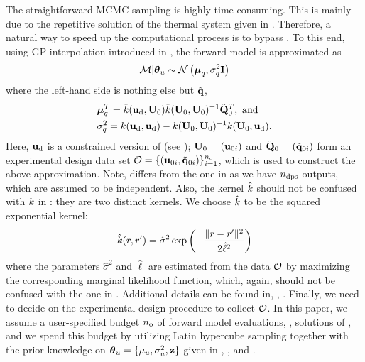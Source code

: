 The straightforward MCMC sampling is highly time-consuming. This is mainly due to the repetitive solution of the thermal system given in . Therefore, a natural way to speed up the computational process is to bypass . To this end, using GP interpolation introduced in , the forward model is approximated as
\begin{equation} \elabel{gp-approximation}
  \model | \vparam_\u \sim \gaussian{\vmean_\T}{\sigma^2_\T \mI}
\end{equation}
where the left-hand side is nothing else but $\tilde{\mathbf{q}}$,
\begin{align}
  & \vmean_\T^T = \hat{\fCov}(\vu_\data, \mU_0) \hat{\fCov}(\mU_0, \mU_0)^{-1} \mmT_0^T, \text{ and} \elabel{gp-mean} \\
  & \sigma^2_\T = \fCov{\vu_\data, \vu_\data} - \fCov{\mU_0, \mU_0}^{-1} \fCov{\mU_0, \vu_\data}. \elabel{gp-variance}
\end{align}
Here, $\mathbf{u}_{\text{d}}$ is a constrained version of  (see ); $\mathbf{U}_0 = (\mathbf{u}_{0i})$ and $\tilde{\mathbf{Q}}_0 = (\tilde{\mathbf{q}}_{0i})$ form an experimental design data set $\mathcal{O} = \{ (\mathbf{u}_{0i}, \tilde{\mathbf{q}}_{0i}) \}_{i = 1}^{n_\text{o}}$, which is used to construct the above approximation. Note,  differs from the one in  as we have ${n_\text{dps}}$ outputs, which are assumed to be independent. Also, the kernel $\hat{\fCov}$ should not be confused with $\fCov$ in : they are two distinct kernels. We choose $\hat{\fCov}$ to be the squared exponential kernel:
\[
  \hat{\fCov}(\r, \r') = \hat{\sigma}^2 \exp\left(-\frac{\norm{\r - \r'}^2}{2 \hat{\ell}^2}\right)
\]
where the parameters $\hat{\sigma}^2$ and $\hat{\ell}$ are estimated from the data $\mathcal{O}$ by maximizing the corresponding marginal likelihood function, which, again, should not be confused with the one in . Additional details can be found in, \eg, \cite{mackay2003, rasmussen2006}. Finally, we need to decide on the experimental design procedure to collect $\mathcal{O}$. In this paper, we assume a user-specified budget ${n_\text{o}}$ of forward model evaluations, \ie, solutions of , and we spend this budget by utilizing Latin hypercube sampling together with the prior knowledge on ${\boldsymbol\theta}_u = \{ \mu_u, \sigma_u^2, \mathbf{z} \}$ given in , , and .

